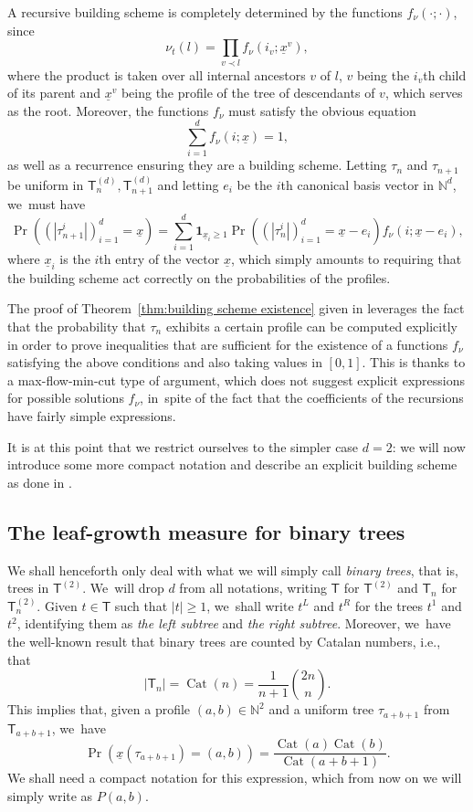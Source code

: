 \documentclass[11pt]{article}
\newcommand{\sT}{\mathsf{T}}
\newcommand{\Cat}{\operatorname{Cat}}
\theoremstyle{definition}
\begin{document}
A recursive building scheme is completely determined by the functions $f_\nu(\cdot ; \cdot)$, since
\[
\nu_t(l)=\prod_{v\prec l}f_\nu(i_v;\underline{x}^v),
\]
where the product is taken over all internal ancestors $v$ of $l$, $v$ being the $i_v$th child of its parent and $\underline{x}^v$ being the profile of the tree of descendants of $v$, which serves as the root. Moreover, the functions $f_\nu$ must satisfy the obvious equation
\[
\sum_{i=1}^df_\nu(i;\underline{x})=1,
\]
as well as a recurrence ensuring they are a building scheme. Letting $\tau_n$ and $\tau_{n+1}$ be uniform in $\sT_n^{(d)}, \sT_{n+1}^{(d)}$ and letting $e_i$ be the $i$th canonical basis vector in $\mathbb{N}^d$, we~must have
\begin{equation}\label{eq:d-ary recursion}\Pr((|\tau_{n+1}^i|)_{i=1}^d=\underline{x})=\sum_{i=1}^d\mathbf{1}_{\underline{x}_i\geq 1}\Pr((|\tau_{n}^i|)_{i=1}^d=\underline{x}-e_i)f_\nu(i;\underline{x}-e_i),\end{equation}
where $\underline{x}_i$ is the $i$th entry of the vector $\underline{x}$, which simply amounts to requiring that the building scheme act correctly on the probabilities of the profiles.

The proof of Theorem~\ref{thm:building scheme existence} given in \cite{LW04} leverages the fact that the probability that $\tau_n$ exhibits a certain profile can be computed explicitly in order to prove inequalities that are sufficient for the existence of a functions $f_\nu$ satisfying the above conditions and also taking values in $[0,1]$. This is thanks to a max-flow-min-cut type of argument, which does not suggest explicit expressions for possible solutions $f_\nu$, in~spite of the fact that the coefficients of the recursions have fairly simple expressions.

It is at this point that we restrict ourselves to the simpler case $d=2$: we will now introduce some more compact notation and describe an explicit building scheme as done in \cite{CS20}.

\subsection{The leaf-growth measure for binary trees}

We shall henceforth only deal with what we will simply call \emph{binary trees}, that is, trees in $\sT^{(2)}$. We~will drop $d$ from all notations, writing $\sT$ for $\sT^{(2)}$ and $\sT_n$ for $\sT_n^{(2)}$. Given $t\in \sT$ such that $|t|\geq 1$, we~shall write $t^L$ and $t^R$ for the trees $t^1$ and $t^2$, identifying them as \emph{the left subtree} and \emph{the right subtree}. Moreover, we~have the well-known result that binary trees are counted by Catalan numbers, i.e., that
\[
|\sT_n|=\Cat(n)=\frac{1}{n+1}\binom{2n}{n}.
\]
This implies that, given a profile $(a,b)\in\mathbb{N}^2$ and a uniform tree $\tau_{a+b+1}$ from $\sT_{a+b+1}$, we~have
\[
\Pr(\underline{x}(\tau_{a+b+1})=(a,b))=\frac{\Cat(a)\Cat(b)}{\Cat(a+b+1)}.
\]
We shall need a compact notation for this expression, which from now on we will simply write as $P(a,b)$.
\end{document}
